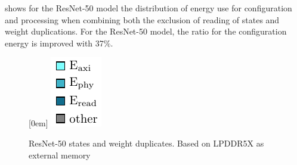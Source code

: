  shows for the ResNet-50 model the distribution of energy use for configuration and processing when combining both the exclusion of reading of states and weight duplications.
For the ResNet-50 model, the ratio for the configuration energy is improved with 37\%.

\begin{figure}[hbtp]
    \centering
    \hfill
    \subcaptionbox*{}[0em]{
        \includegraphics{assets/legend.pdf}
    }
    \hfill
    \caption{ResNet-50 states and weight duplicates. Based on LPDDR5X as external memory}
    \label{fig:pies_resnet50_no_states_and_dupes_lpddr5x}
\end{figure}

